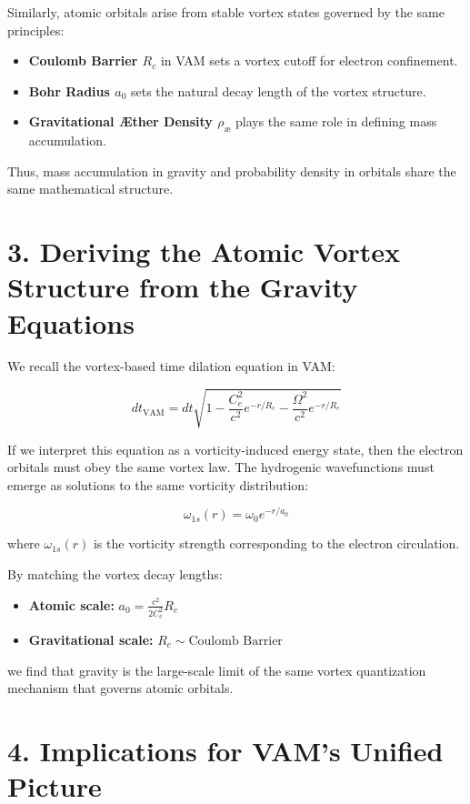 Similarly, atomic orbitals arise from stable vortex states governed by the same principles:

\begin{itemize}
    \item \textbf{Coulomb Barrier \(R_c\)} in VAM sets a vortex cutoff for electron confinement.
    \item \textbf{Bohr Radius \(a_0\)} sets the natural decay length of the vortex structure.
    \item \textbf{Gravitational Æther Density \(\rho_\text{\ae}\)} plays the same role in defining mass accumulation.
\end{itemize}

Thus, mass accumulation in gravity and probability density in orbitals share the same mathematical structure.

\section*{3. Deriving the Atomic Vortex Structure from the Gravity Equations}

We recall the vortex-based time dilation equation in VAM:

\[
dt_\text{VAM} = dt \sqrt{1 - \frac{C_e^2}{c^2} e^{-r/R_c} - \frac{\Omega^2}{c^2} e^{-r/R_c}}
\]

If we interpret this equation as a vorticity-induced energy state, then the electron orbitals must obey the same vortex law. The hydrogenic wavefunctions must emerge as solutions to the same vorticity distribution:

\[
\omega_{1s}(r) = \omega_0 e^{-r/a_0}
\]

where \(\omega_{1s}(r)\) is the vorticity strength corresponding to the electron circulation.

By matching the vortex decay lengths:

\begin{itemize}
    \item \textbf{Atomic scale:} \(a_0 = \frac{c^2}{2C_e^2} R_c\)
    \item \textbf{Gravitational scale:} \(R_c \sim \text{Coulomb Barrier}\)
\end{itemize}

we find that gravity is the large-scale limit of the same vortex quantization mechanism that governs atomic orbitals.

\section*{4. Implications for VAM's Unified Picture}

